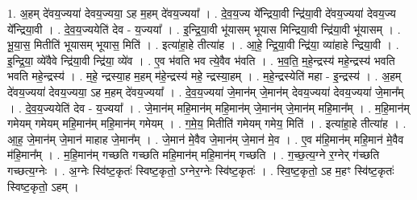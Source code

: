 \documentclass[17pt]{extarticle}
\begin{document}
1. अ॒हम् दे॑वय॒ज्यया॑ देवय॒ज्यया॒ ऽह म॒हम् दे॑वय॒ज्यया᳚ । . दे॒व॒य॒ज्य ये᳚न्द्रिया॒वी न्द्रि॑या॒वी दे॑वय॒ज्यया॑ देवय॒ज्य ये᳚न्द्रिया॒वी । . दे॒व॒य॒ज्ययेति॑ देव - य॒ज्यया᳚ । . इ॒न्द्रि॒या॒वी भू॑यासम् भूयास मिन्द्रिया॒वी न्द्रि॑या॒वी भू॑यासम् । . भू॒या॒स॒ मितीति॑ भूयासम् भूयास॒ मिति॑ । . इत्या॑हा॒हे तीत्या॑ह । . आ॒हे॒ न्द्रि॒या॒वी न्द्रि॑या॒ व्या॑हाहे न्द्रिया॒वी । . इ॒न्द्रि॒या॒ व्ये॑वैवे न्द्रि॑या॒वी न्द्रि॑या॒ व्ये॑व । . ए॒व भ॑वति भव त्ये॒वैव भ॑वति । . भ॒व॒ति॒ म॒हे॒न्द्रस्य॑ महे॒न्द्रस्य॑ भवति भवति महे॒न्द्रस्य॑ । . म॒हे॒ न्द्रस्या॒ह म॒हम् म॑हे॒न्द्रस्य॑ महे॒ न्द्रस्या॒हम् । . म॒हे॒न्द्रस्येति॑ महा - इ॒न्द्रस्य॑ । . अ॒हम् दे॑वय॒ज्यया॑ देवय॒ज्यया॒ ऽह म॒हम् दे॑वय॒ज्यया᳚ । . दे॒व॒य॒ज्यया॑ जे॒मान॑म् जे॒मान॑म् देवय॒ज्यया॑ देवय॒ज्यया॑ जे॒मान᳚म् । . दे॒व॒य॒ज्ययेति॑ देव - य॒ज्यया᳚ । . जे॒मान॑म् महि॒मान॑म् महि॒मान॑म् जे॒मान॑म् जे॒मान॑म् महि॒मान᳚म् । . म॒हि॒मान॑म् गमेयम् गमेयम् महि॒मान॑म् महि॒मान॑म् गमेयम् । . ग॒मे॒य॒ मितीति॑ गमेयम् गमेय॒ मिति॑ । . इत्या॑हा॒हे तीत्या॑ह । . आ॒ह॒ जे॒मान॑म् जे॒मान॑ माहाह जे॒मान᳚म् । . जे॒मान॑ मे॒वैव जे॒मान॑म् जे॒मान॑ मे॒व । . ए॒व म॑हि॒मान॑म् महि॒मान॑ मे॒वैव म॑हि॒मान᳚म् । . म॒हि॒मान॑म् गच्छति गच्छति महि॒मान॑म् महि॒मान॑म् गच्छति । . ग॒च्छ॒त्य॒ग्ने र॒ग्नेर् ग॑च्छति गच्छत्य॒ग्नेः । . अ॒ग्नेः स्वि॑ष्ट॒कृतः॑ स्विष्ट॒कृतो॒ ऽग्नेर॒ग्नेः स्वि॑ष्ट॒कृतः॑ । . स्वि॒ष्ट॒कृतो॒ ऽह म॒हꣳ स्वि॑ष्ट॒कृतः॑ स्विष्ट॒कृतो॒ ऽहम् । \newline
\end{document}
